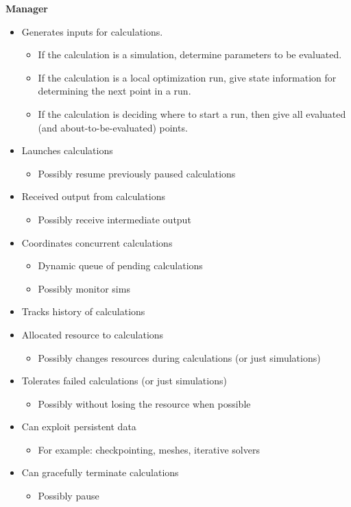 \documentclass{article}
\begin{document}
\noindent \textbf{Manager}
\begin{itemize}
  \item Generates inputs for calculations.
    \begin{itemize}
      \item If the calculation is a simulation, determine parameters to be
        evaluated.
      \item If the calculation is a local optimization run, give state
        information for determining the next point in a run.
      \item If the calculation is deciding where to start a run, then give all
        evaluated (and about-to-be-evaluated) points.
    \end{itemize}
  \item Launches calculations
    \begin{itemize}
      \item Possibly resume previously paused calculations
    \end{itemize}
  \item Received output from calculations
    \begin{itemize}
      \item Possibly receive intermediate output
    \end{itemize}
  \item Coordinates concurrent calculations
    \begin{itemize}
      \item Dynamic queue of pending calculations
      \item Possibly monitor sims
    \end{itemize}
  \item Tracks history of calculations
  \item Allocated resource to calculations
    \begin{itemize}
      \item Possibly changes resources during calculations (or just simulations)
    \end{itemize}
  \item Tolerates failed calculations (or just simulations)
    \begin{itemize}
      \item Possibly without losing the resource when possible
    \end{itemize}
  \item Can exploit persistent data
    \begin{itemize}
      \item For example: checkpointing, meshes, iterative solvers
    \end{itemize}
  \item Can gracefully terminate calculations
    \begin{itemize}
      \item Possibly pause
    \end{itemize}
\end{itemize}
\end{document}
